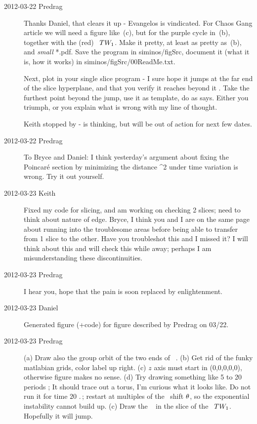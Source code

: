 \begin{description}
\item[2012-03-22 Predrag~~] Thanks Daniel, that clears it up - Evangelos
is vindicated. For Chaos Gang article we will need a figure like
\,{(c)}, but for the purple cycle  in
\,{(b)}, together with the (red) \reqv\
$TW_{1}$. Make it pretty, at least as pretty as
\,{(b)}, and \emph{small} *.pdf. Save the
program in siminos/figSrc, document it (what it is, how it works) in
siminos/figSrc/00ReadMe.txt.

Next, plot   in your single slice program - I sure hope it
jumps at the far end of the slice hyperplane, and that you verify it
reaches beyond it \chartBord. Take the furthest point beyond the jump,
use it as template, do as \reffig{fig:A29-2slices} says. Either you
triumph, or you explain what is wrong with my line of thought.

Keith stopped by - is thinking, but will be out of action for next few
dates.

\item[2012-03-22 Predrag~~] To Bryce and Daniel: I think yesterday's
argument about fixing the Poincar\'e section by  minimizing the distance
\beq
\Norm{\ssp(\zeit) - \slicep)}^2
under time variation is wrong.  Try it out yourself.

\item[2012-03-23 Keith~~] Fixed my code for slicing, and am working on
checking 2 slices; need to think about nature of edge.  Bryce, I think
you and I are on the same page about running into the troublesome areas
before being able to transfer from 1 slice to the other.  Have you
troubleshot this and I missed it?  I will think about this and will check
this while away; perhaps I am misunderstanding these discontinuities.

\item[2012-03-23 Predrag~~] I hear you, hope that the pain is soon replaced by
enlightenment.


\item[2012-03-23 Daniel~~]
Generated figure (+code) for figure described by Predrag on 03/22.

\item[2012-03-23 Predrag~~]
(a) Draw also the group orbit of the two ends of \rpo\ .
(b) Get rid of the funky matlabian grids, color label up right.
(c) $z$ axis must start in (0,0,0,0,0), otherwise figure makes no sense.
(d) Try drawing something like 5 to 20 periods \period{}; It should trace
out a torus, I'm curious what it looks like. Do not run it for time
$20\,\period{}$; restart at multiples of the \rpo\ shift $\theta$, so
the exponential instability cannot build up.
(c) Draw the \po\  in the slice of the \eqv\ $TW_{1}$.
Hopefully it will jump.


\end{description}
